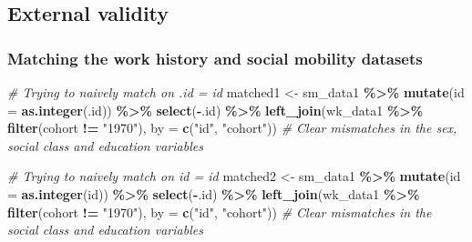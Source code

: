 \documentclass[
]{article}
\newenvironment{Shaded}{\begin{snugshade}}{\end{snugshade}}
\newcommand{\AttributeTok}[1]{\textcolor[rgb]{0.13,0.29,0.53}{#1}}
\newcommand{\CommentTok}[1]{\textcolor[rgb]{0.56,0.35,0.01}{\textit{#1}}}
\newcommand{\FunctionTok}[1]{\textcolor[rgb]{0.13,0.29,0.53}{\textbf{#1}}}
\newcommand{\NormalTok}[1]{#1}
\newcommand{\OtherTok}[1]{\textcolor[rgb]{0.56,0.35,0.01}{#1}}
\newcommand{\SpecialCharTok}[1]{\textcolor[rgb]{0.81,0.36,0.00}{\textbf{#1}}}
\newcommand{\StringTok}[1]{\textcolor[rgb]{0.31,0.60,0.02}{#1}}
\begin{document}
\subsection{External validity}\label{external-validity}

\subsubsection{Matching the work history and social mobility
datasets}\label{matching-the-work-history-and-social-mobility-datasets}

\begin{Shaded}
\begin{Highlighting}[]
\CommentTok{\# Trying to naively match on \textasciigrave{}.id\textasciigrave{} = \textasciigrave{}id\textasciigrave{} }
\NormalTok{matched1 }\OtherTok{\textless{}{-}}\NormalTok{ sm\_data1 }\SpecialCharTok{\%\textgreater{}\%} 
  \FunctionTok{mutate}\NormalTok{(}\AttributeTok{id =} \FunctionTok{as.integer}\NormalTok{(.id)) }\SpecialCharTok{\%\textgreater{}\%}
  \FunctionTok{select}\NormalTok{(}\SpecialCharTok{{-}}\NormalTok{.id) }\SpecialCharTok{\%\textgreater{}\%}
  \FunctionTok{left\_join}\NormalTok{(wk\_data1 }\SpecialCharTok{\%\textgreater{}\%} 
              \FunctionTok{filter}\NormalTok{(cohort }\SpecialCharTok{!=} \StringTok{"1970"}\NormalTok{), }\AttributeTok{by =} \FunctionTok{c}\NormalTok{(}\StringTok{"id"}\NormalTok{, }\StringTok{"cohort"}\NormalTok{))}
\CommentTok{\# Clear mismatches in the sex, social class and education variables}

\CommentTok{\# Trying to naively match on \textasciigrave{}id\textasciigrave{} = \textasciigrave{}id\textasciigrave{} }
\NormalTok{matched2 }\OtherTok{\textless{}{-}}\NormalTok{ sm\_data1 }\SpecialCharTok{\%\textgreater{}\%} 
  \FunctionTok{mutate}\NormalTok{(}\AttributeTok{id =} \FunctionTok{as.integer}\NormalTok{(id)) }\SpecialCharTok{\%\textgreater{}\%}
  \FunctionTok{select}\NormalTok{(}\SpecialCharTok{{-}}\NormalTok{.id) }\SpecialCharTok{\%\textgreater{}\%}
  \FunctionTok{left\_join}\NormalTok{(wk\_data1 }\SpecialCharTok{\%\textgreater{}\%} 
              \FunctionTok{filter}\NormalTok{(cohort }\SpecialCharTok{!=} \StringTok{"1970"}\NormalTok{), }\AttributeTok{by =} \FunctionTok{c}\NormalTok{(}\StringTok{"id"}\NormalTok{, }\StringTok{"cohort"}\NormalTok{))}
\CommentTok{\# Clear mismatches in the social class and education variables}
\end{Highlighting}
\end{Shaded}
\end{document}
